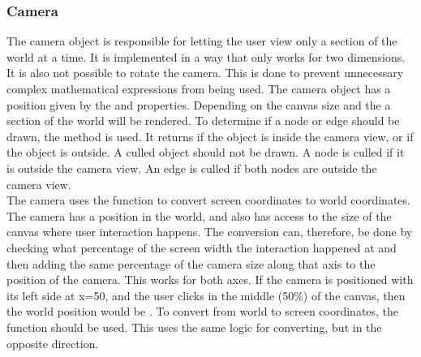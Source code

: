 \subsubsection{Camera}
The camera object is responsible for letting the user view only a section of the world at a time. It is implemented in a way that only works for two dimensions. It is also not possible to rotate the camera. This is done to prevent unnecessary complex mathematical expressions from being used. The camera object has a position given by the  and  properties. Depending on the canvas size and the  a section of the world will be rendered. To determine if a node or edge should be drawn, the  method is used. It returns  if the object is inside the camera view, or  if the object is outside. A culled object should not be drawn. A node is culled if it is outside the camera view. An edge is culled if both nodes are outside the camera view.
\\[11pt]
The camera uses the  function to convert screen coordinates to world coordinates. The camera has a position in the world, and also has access to the size of the canvas where user interaction happens. The conversion can, therefore, be done by checking what percentage of the screen width the interaction happened at and then adding the same percentage of the camera size along that axis to the position of the camera. This works for both axes. If the camera is positioned with its left side at x=50, and the user clicks in the middle (50\%) of the canvas, then the world position would be . To convert from world to screen coordinates, the  function should be used. This uses the same logic for converting, but in the opposite direction.
